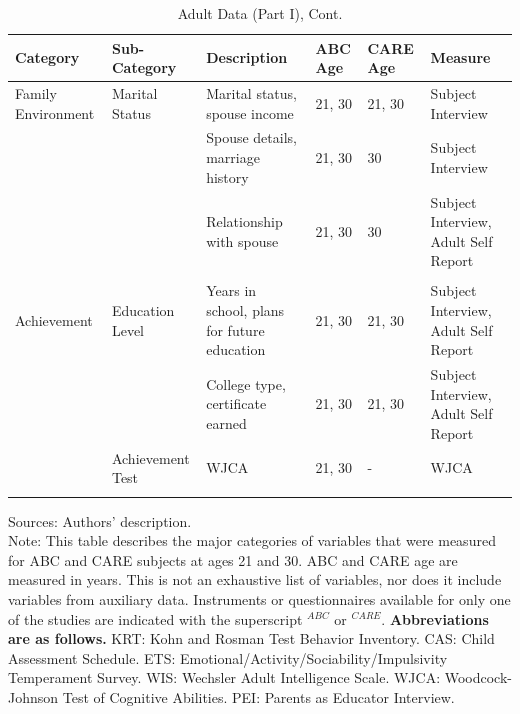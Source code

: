 \documentclass[static]{JJH-Beamer}
\begin{document}
\clearpage
\begin{frame}

\begin{table}[H]
\addtocounter{table}{-1}
\caption{Adult Data (Part I), Cont.}						
\begin{center}
\begin{tiny}							
\begin{tabular}{L{1.2cm} C{1.4cm} C{2.5cm} C{.8cm} C{.8cm} C{2.9cm}}										
\toprule
\textbf{Category}	&	\textbf{Sub-Category}	&	\textbf{Description}	&	\textbf{ABC Age}  	&  \textbf{CARE Age}  & 	\textbf{Measure}	\\ \midrule								
Family Environment      	&	       Marital Status  	&	       Marital status, spouse income       	&	       21, 30  	&	21, 30	&	       Subject Interview       \\
        	&	               	&	       Spouse details, marriage history	&	       21, 30  	&	30	&	       Subject Interview       \\
        	&	               	&	       Relationship with spouse        	&	       21, 30  	&	30	&	       Subject Interview, Adult Self Report    \\
\\										
 Achievement   	&	       Education Level 	&	       Years in school, plans for future education      	&	       21, 30  	&	       21, 30  	&	       Subject Interview, Adult Self Report    \\
        	&	               	&	       College type, certificate earned        	&	       21, 30  	&	       21, 30  	&	       Subject Interview, Adult Self Report    \\
	&	Achievement Test	&	       WJCA    	&	       21, 30  	&	-	&	       WJCA    \\
	&		&							\\
\bottomrule							
\end{tabular}										
\end{tiny}
\end{center}							
\end{table}

\end{frame}

{\flushleft \normalsize Sources: Authors' description. \\				
Note: This table describes the major categories of variables that were measured for ABC and CARE subjects at ages 21 and 30. ABC and CARE age are measured in years. This is not an exhaustive list of variables, nor does it include variables from auxiliary data. Instruments or questionnaires available for only one of the studies are indicated with the superscript $^{ABC}$ or $^{CARE}$. \textbf{Abbreviations are as follows.} KRT: Kohn and Rosman Test Behavior Inventory. CAS: Child Assessment Schedule. ETS: Emotional/Activity/Sociability/Impulsivity Temperament Survey. WIS: Wechsler Adult Intelligence Scale. WJCA: Woodcock-Johnson Test of Cognitive Abilities. PEI: Parents as Educator Interview.\\}
\end{document}
